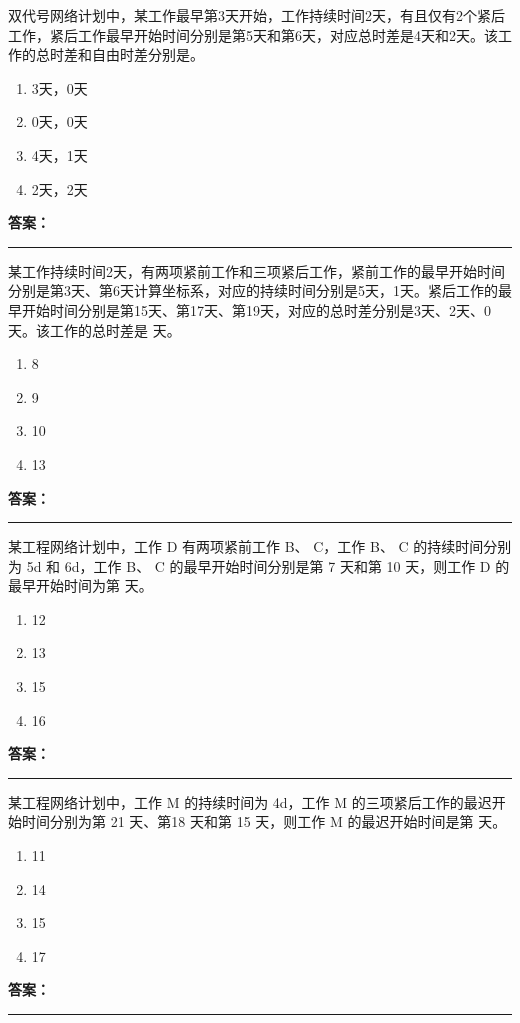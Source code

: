 \documentclass[UTF8,fontset=fandol,11pt]{ctexart}
\newcommand{\answerline}{\textcolor{answerred}{\rule{2.4cm}{0.7pt}}}
\begin{document}
\begin{quizbox}[title={第 4 题}]
双代号网络计划中，某工作最早第3天开始，工作持续时间2天，有且仅有2个紧后工作，紧后工作最早开始时间分别是第5天和第6天，对应总时差是4天和2天。该工作的总时差和自由时差分别是。\\
\begin{enumerate}[label=\Alph*.]
\item 3天，0天
\item 0天，0天
\item 4天，1天
\item 2天，2天
\end{enumerate}
\textbf{\textcolor{answerred}{答案：}} \answerline
\end{quizbox}

\begin{quizbox}[title={第 5 题}]
某工作持续时间2天，有两项紧前工作和三项紧后工作，紧前工作的最早开始时间分别是第3天、第6天计算坐标系，对应的持续时间分别是5天，1天。紧后工作的最早开始时间分别是第15天、第17天、第19天，对应的总时差分别是3天、2天、0天。该工作的总时差是 天。\\
\begin{enumerate}[label=\Alph*.]
\item 8
\item 9
\item 10
\item 13
\end{enumerate}
\textbf{\textcolor{answerred}{答案：}} \answerline
\end{quizbox}

\begin{quizbox}[title={第 6 题}]
某工程网络计划中，工作 D 有两项紧前工作 B、 C，工作 B、 C 的持续时间分别为 5d 和 6d，工作 B、 C 的最早开始时间分别是第 7 天和第 10 天，则工作 D 的最早开始时间为第 天。\\
\begin{enumerate}[label=\Alph*.]
\item 12
\item 13
\item 15
\item 16
\end{enumerate}
\textbf{\textcolor{answerred}{答案：}} \answerline
\end{quizbox}

\begin{quizbox}[title={第 7 题}]
某工程网络计划中，工作 M 的持续时间为 4d，工作 M 的三项紧后工作的最迟开始时间分别为第 21 天、第18 天和第 15 天，则工作 M 的最迟开始时间是第 天。\\
\begin{enumerate}[label=\Alph*.]
\item 11
\item 14
\item 15
\item 17
\end{enumerate}
\textbf{\textcolor{answerred}{答案：}} \answerline
\end{quizbox}
\end{document}
